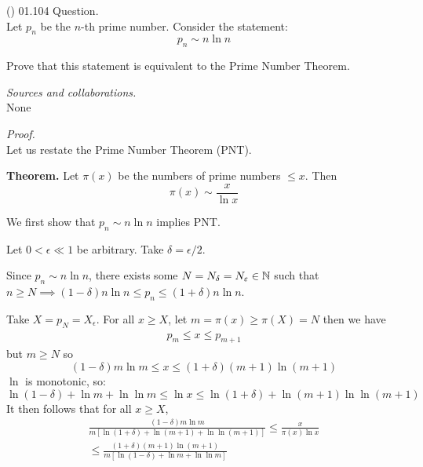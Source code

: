 \documentclass{amsart}
\begin{document}
\vspace{1cm}

\newpage
\Large
{}

\noindent
(\done) 01.104 Question. \\
Let $p_n$ be the $n$-th prime number. Consider the statement:
\begin{equation*}
p_n \sim n \ln n
\end{equation*}

Prove that this statement is equivalent to the Prime Number Theorem.

\medskip\noindent
\emph{Sources and collaborations.}\\
None

\medskip\noindent
\emph{Proof.}\\
Let us restate the Prime Number Theorem (PNT).

\textbf{Theorem.} Let $\pi(x)$ be the numbers of prime numbers $\leq x$. Then \begin{equation*}
\pi(x) \sim \frac{x}{\ln x}
\end{equation*}

\pffwd We first show that $p_n \sim n \ln n$ implies PNT.

Let $0 < \epsilon \ll 1$ be arbitrary. Take $\delta = \epsilon/2$.

Since $p_n \sim n \ln n$, there exists some $N = N_\delta = N_\varepsilon \in \mathbb{N}$ such that $n \geq N \implies (1-\delta) n \ln n \leq p_n \leq (1+\delta) n \ln n$.

Take $X = p_N = X_\epsilon$. For all $x \geq X$, let $m = \pi(x) \geq \pi(X) = N$ then we have
\begin{align*}
    p_{m} \leq x \leq p_{m + 1}
\end{align*}
but $m \geq N$ so \begin{equation*}
(1-\delta)m \ln m \leq x \leq (1 + \delta) (m+1) \ln (m+1)
\end{equation*}
$\ln$ is monotonic, so:
\begin{equation*}
\ln(1-\delta) + \ln m  + \ln\ln m \leq \ln x \leq \ln(1 + \delta) + \ln (m+1) \ln\ln (m+1)
\end{equation*}
It then follows that for all $x \geq X$,
\begin{multline*}
    \frac{(1-\delta) m \ln m}{m[\ln(1+\delta) + \ln (m+1) + \ln \ln (m+1)]} \leq \frac{x}{\pi(x)\ln x} \\
    \leq \frac{(1+\delta) (m+1) \ln (m+1)}{m [\ln(1-\delta) + \ln m + \ln \ln m]}
\end{multline*}
\end{document}
